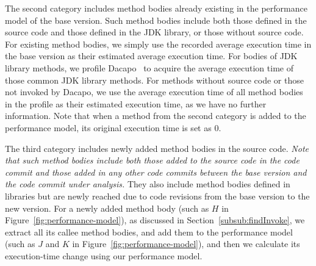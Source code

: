 The second category includes method bodies already existing in the performance model of the base version. Such method bodies include both those defined in the source code and those defined in the JDK library, or those without source code. For existing method bodies, we simply use the recorded average execution time in the base version as their estimated average execution time. For bodies of JDK library methods, we profile Dacapo~\cite{dacapo} to acquire the average execution time of those common JDK library methods. For methods without source code or those not invoked by Dacapo, we use the average execution time of all method bodies in the profile as their estimated execution time, as we have no further information. Note that when a method from the second category is added to the performance model, its original execution time is set as 0.

The third category includes newly added method bodies in the source code. \textit{Note that such method bodies include both those added to the source code in the code commit and those added in any other code commits between the base version and the code commit under analysis.} They also include method bodies defined in libraries but are newly reached due to code revisions from the base version to the new version. For a newly added method body (such as $H$ in Figure~\ref{fig:performance-model}), as discussed in Section~\ref{subsub:findInvoke}, we extract all its callee method bodies, and add them to the performance model (such as $J$ and $K$ in Figure~\ref{fig:performance-model}), and then we calculate its execution-time change using our performance model.




 

